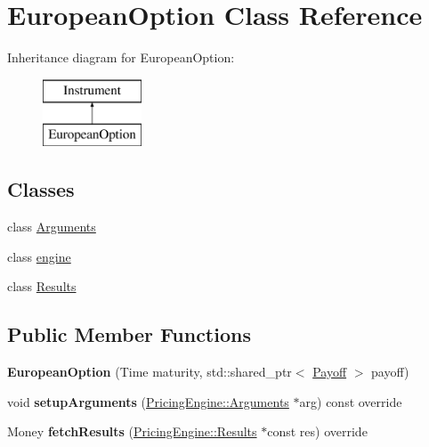 \hypertarget{class_european_option}{}\section{European\+Option Class Reference}
\label{class_european_option}
Inheritance diagram for European\+Option\+:\begin{figure}[H]
\begin{center}
\leavevmode
\includegraphics[height=2.000000cm]{class_european_option}
\end{center}
\end{figure}
\subsection*{Classes}
\begin{DoxyCompactItemize}
\item 
class \hyperlink{class_european_option_1_1_arguments}{Arguments}
\item 
class \hyperlink{class_european_option_1_1engine}{engine}
\item 
class \hyperlink{class_european_option_1_1_results}{Results}
\end{DoxyCompactItemize}
\subsection*{Public Member Functions}
\begin{DoxyCompactItemize}
\item 
\hypertarget{class_european_option_a92132b61922cb628bc355d4d9f302513}{}\label{class_european_option_a92132b61922cb628bc355d4d9f302513} 
{\bfseries European\+Option} (Time maturity, std\+::shared\+\_\+ptr$<$ \hyperlink{class_payoff}{Payoff} $>$ payoff)
\item 
\hypertarget{class_european_option_a94c1826feba0099400bce8dd6fc01cb9}{}\label{class_european_option_a94c1826feba0099400bce8dd6fc01cb9} 
void {\bfseries setup\+Arguments} (\hyperlink{class_pricing_engine_1_1_arguments}{Pricing\+Engine\+::\+Arguments} $\ast$arg) const override
\item 
\hypertarget{class_european_option_ae234d562ef21dc24c25f1538860da1cf}{}\label{class_european_option_ae234d562ef21dc24c25f1538860da1cf} 
Money {\bfseries fetch\+Results} (\hyperlink{class_pricing_engine_1_1_results}{Pricing\+Engine\+::\+Results} $\ast$const res) override
\end{DoxyCompactItemize}
